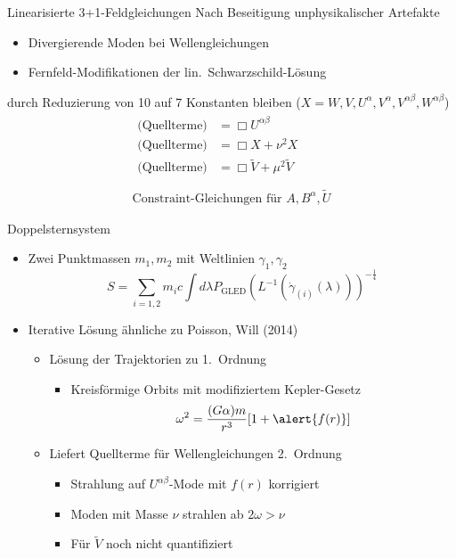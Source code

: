 \documentclass{beamer}
\begin{document}
    \begin{frame}{Linearisierte 3+1-Feldgleichungen}
        Nach Beseitigung unphysikalischer Artefakte
        \begin{itemize}
            \item Divergierende Moden bei Wellengleichungen
            \item Fernfeld-Modifikationen der lin.\ Schwarzschild-Lösung
        \end{itemize}
        durch Reduzierung von 10 auf 7 Konstanten \pause
        bleiben ($X = W,V,U^\alpha,V^\alpha,V^{\alpha\beta},W^{\alpha\beta}$)
        \begin{gather*}
            \begin{aligned}
                \text{(Quellterme)} &= \Box U^{\alpha\beta} \\
                \text{(Quellterme)} &= \Box X + \nu^2 X \\
                \text{(Quellterme)} &= \Box \tilde V + \mu^2 \tilde V \\
            \end{aligned} \\
            \text{Constraint-Gleichungen für }A, B^\alpha, \tilde U
        \end{gather*}
    \end{frame}

    \begin{frame}{Doppelsternsystem}
        \begin{itemize}
            \item Zwei Punktmassen $m_1,m_2$ mit Weltlinien $\gamma_1,\gamma_2$
            \[ S = \sum_{i=1,2} m_i c \int d\lambda P_\text{GLED}(L^{-1}(\dot\gamma_{(i)}(\lambda)))^{-\frac{1}{4}} \] \pause
            \item Iterative Lösung ähnliche zu Poisson, Will (2014) \pause
            \begin{itemize}
                \item Lösung der Trajektorien zu 1.\ Ordnung
                \begin{itemize}
                    \item Kreisförmige Orbits mit \alert{modifiziertem Kepler-Gesetz}
                    \[\omega^2 = \frac{(G\alpha)m}{r^3}\lbrack 1 + \alert{f(r)} \rbrack \]
                \end{itemize} \pause
                \item Liefert Quellterme für Wellengleichungen 2.\ Ordnung
                \begin{itemize}
                    \item \alert{Strahlung auf $U^{\alpha\beta}$-Mode mit $f(r)$ korrigiert}
                    \item \alert{Moden mit Masse $\nu$ strahlen ab $2\omega > \nu$}
                    \item Für $\tilde V$ noch nicht quantifiziert
                \end{itemize}
            \end{itemize}
        \end{itemize}
    \end{frame}
\end{document}
